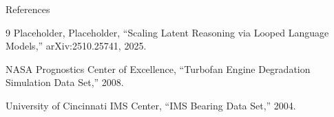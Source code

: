 \begin{frame}[allowframebreaks]{References}
  \begin{thebibliography}{9}
    Placeholder, Placeholder, ``Scaling Latent Reasoning via Looped Language Models,'' arXiv:2510.25741, 2025.

    NASA Prognostics Center of Excellence, ``Turbofan Engine Degradation Simulation Data Set,'' 2008.

    University of Cincinnati IMS Center, ``IMS Bearing Data Set,'' 2004.
  \end{thebibliography}
\end{frame}
